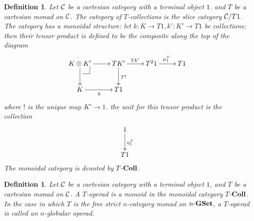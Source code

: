 \documentclass[12pt]{article}
\makeatletter
\theoremstyle{plain}
\newtheorem{definition}[theorem]{Definition}
\theoremstyle{definition}
\newcommand{\pullbackmark}[2]{\save ;p+<.8pc,0pc>:(0,-1)::%
(#1) *{\phantom{Z}} %
;p+(#2)-(0,0) **@{-}%
;p-(#1)+(0,0) *{\phantom{Z}} **@{-} \restore}
\makeatother
\begin{document}
\begin{definition}
Let ${\cal C}$ be a cartesian category with a terminal object $1$. and $T$ be a cartesian monad on ${\cal C}$. The category of {\em $T$-collections} is the slice category ${\cal C}/T1$. The category has a monoidal structure: let $k: K \rightarrow T1, k': K' \rightarrow T1$ be collections; then their tensor product is defined to be the composite along the top of the diagram
\[ \xymatrix{
K \otimes K' \ar[r] \ar[d] \pullbackmark{0,1.5}{1.5,0} & TK' \ar[r]^{Tk'} \ar[d]^{T!} & T^2 1 \ar[r]^{\mu^T_1} & T1 \\
K \ar[r]_k & T1 & &
} \]
where $!$ is the unique map $K' \rightarrow 1$. the unit for this  tensor product is the collection
\[ \xymatrix{
1 \ar[d]^{\eta^T_1} \\
T1
} \]
The monoidal category is denoted by $T \mathchar`- {\bf Coll}$. 
\end{definition}

\begin{definition}
Let ${\cal C}$ be a cartesian category with a terminal object $1$, and $T$ be a cartesian monad on ${\cal C}$. A \emph{$T$-operad} is a monoid  in the monoidal category $T$-${\bf Coll}$. In the case in which $T$ is the free strict $n$-category monad on $n \mathchar`- {\bf GSet}$, a $T$-operad is called an \emph{$n$-globular operad}.
\end{definition}
\end{document}
